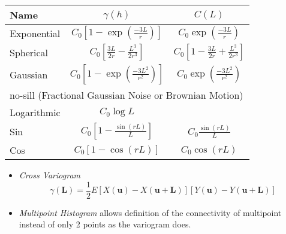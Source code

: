 \documentclass[10pt,landscape]{article}
\begin{document}
\begin{multicols}{3}
\begin{itemize}
\end{itemize}
\begin{tabular}{lcc}
Name			& $\gamma(h)$  & $C(L)$  \\
\hline
Exponential 		& $C_0 \left[1-\exp\left(\frac{-3L}{r}\right)\right]$ 	& $C_0 \exp\left(\frac{-3L}{r}\right)$\\
Spherical		& $C_0 \left[\frac{3L}{2r}-\frac{L^3}{2r^3}\right]$		& $C_0 \left[1-\frac{3L}{2r}+\frac{L^3}{2r^3}\right]$ \\
Gaussian 		& $C_0 \left[1-\exp\left(\frac{-3L^2}{r^2}\right)\right]$& $C_0 \exp\left(\frac{-3L^2}{r^2}\right)$\\ 
\multicolumn{3}{l}{no-sill (Fractional Gaussian Noise or Brownian Motion)}\\
Logarithmic 		& $C_0 \log L$&\\
Sin		 		& $C_0\left[1-\frac{\sin(rL)}{L}\right]$ 				& $C_0\frac{\sin(rL)}{L}$\\
Cos		 		& $C_0\left[1-\cos(rL)\right]$ 							& $C_0\cos(rL)$\\
\end{tabular}
\begin{itemize}
	\item \emph{Cross Variogram}
\[\gamma(\mathbf{L})=\frac{1}{2}E\left[X(\mathbf{u}) - X(\mathbf{u}+\mathbf{L})\right] \left[Y(\mathbf{u}) - Y(\mathbf{u}+\mathbf{L})\right]\]
	\item \emph{Multipoint Histogram} allows definition of the connectivity of multipoint instead of only 2 points as the variogram does.
\end{itemize}









\end{multicols}
\end{document}
